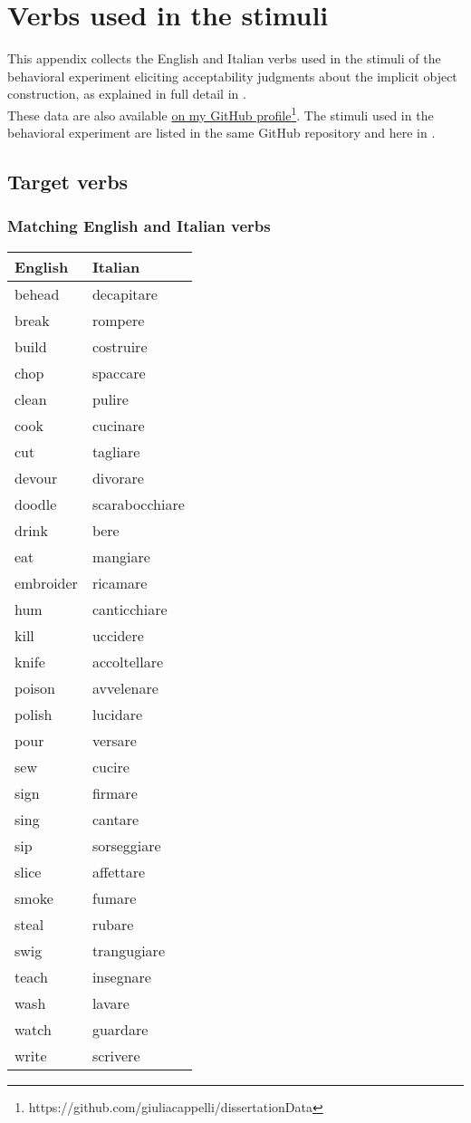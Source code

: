 \setchapterpreamble[u]{\margintoc}
\chapter{Verbs used in the stimuli}

This appendix collects the English and Italian verbs used in the stimuli of the behavioral experiment eliciting acceptability judgments about the implicit object construction, as explained in full detail in .\\
These data are also available \href{https://github.com/giuliacappelli/dissertationData}{on my GitHub profile}\footnote{https://github.com/giuliacappelli/dissertationData}. The stimuli used in the behavioral experiment are listed in the same GitHub repository and here in .

\section{Target verbs}

\subsection{Matching English and Italian verbs}

\begin{longtable}{l|l}
\textbf{English}      & \textbf{Italian}    \\
\hline
\endhead
behead	&	decapitare	\\
break	&	rompere	\\
build	&	costruire\\	
chop	&	spaccare	\\
clean	&	pulire	\\
cook	&	cucinare	\\
cut	&	tagliare	\\
devour	&	divorare	\\
doodle	&	scarabocchiare\\	
drink	&	bere	\\
eat	&	mangiare	\\
embroider	&	ricamare	\\
hum	&	canticchiare	\\
kill	&	uccidere	\\
knife	&	accoltellare	\\
poison	&	avvelenare	\\
polish	&	lucidare	\\
pour	&	versare	\\
sew	&	cucire	\\
sign	&	firmare	\\
sing	&	cantare	\\
sip	&	sorseggiare	\\
slice	&	affettare\\	
smoke	&	fumare	\\
steal	&	rubare	\\
swig	&	trangugiare	\\
teach	&	insegnare	\\
wash	&	lavare	\\
watch	&	guardare	\\
write	&	scrivere  
\end{longtable}

